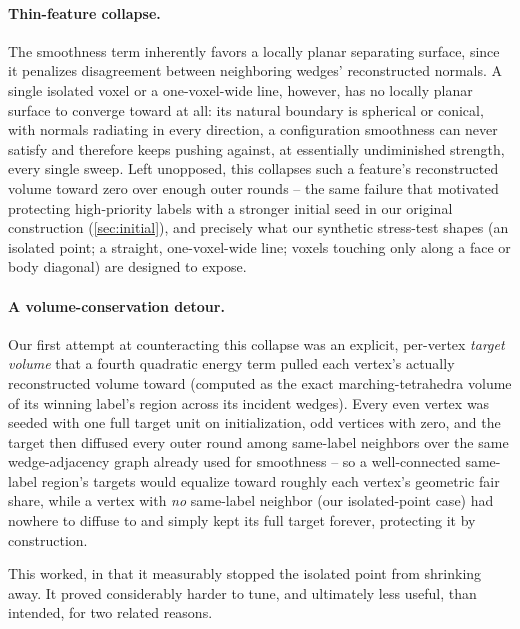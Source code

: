 \documentclass[journal]{vgtc}                     %
\begin{document}
\paragraph{Thin-feature collapse.} The smoothness term inherently favors a locally planar separating surface, since it penalizes disagreement between neighboring wedges' reconstructed normals. A single isolated voxel or a one-voxel-wide line, however, has no locally planar surface to converge toward at all: its natural boundary is spherical or conical, with normals radiating in every direction, a configuration smoothness can never satisfy and therefore keeps pushing against, at essentially undiminished strength, every single sweep. Left unopposed, this collapses such a feature's reconstructed volume toward zero over enough outer rounds -- the same failure that motivated protecting high-priority labels with a stronger initial seed in our original construction (\cref{sec:initial}), and precisely what our synthetic stress-test shapes (an isolated point; a straight, one-voxel-wide line; voxels touching only along a face or body diagonal) are designed to expose.

\paragraph{A volume-conservation detour.} Our first attempt at counteracting this collapse was an explicit, per-vertex \emph{target volume} that a fourth quadratic energy term pulled each vertex's actually reconstructed volume toward (computed as the exact marching-tetrahedra volume of its winning label's region across its incident wedges). Every even vertex was seeded with one full target unit on initialization, odd vertices with zero, and the target then diffused every outer round among same-label neighbors over the same wedge-adjacency graph already used for smoothness -- so a well-connected same-label region's targets would equalize toward roughly each vertex's geometric fair share, while a vertex with \emph{no} same-label neighbor (our isolated-point case) had nowhere to diffuse to and simply kept its full target forever, protecting it by construction.

This worked, in that it measurably stopped the isolated point from shrinking away. It proved considerably harder to tune, and ultimately less useful, than intended, for two related reasons.
\end{document}
